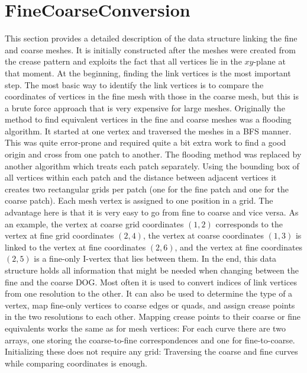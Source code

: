 \documentclass[a4paper,twoside,12pt,nochapterprefix]{scrbook}
\begin{document}
\section{FineCoarseConversion}\label{sec:conversion} %
This section provides a detailed description of the data structure linking the fine and coarse meshes. It is initially constructed after the meshes were created from the crease pattern and exploits the fact that all vertices lie in the $xy$-plane at that moment.\newline
At the beginning, finding the link vertices is the most important step. The most basic way to identify the link vertices is to compare the coordinates of vertices in the fine mesh with those in the coarse mesh, but this is a brute force approach that is very expensive for large meshes.\newline
Originally the method to find equivalent vertices in the fine and coarse meshes was a flooding algorithm. It started at one vertex and traversed the meshes in a BFS manner. This was quite error-prone and required quite a bit extra work to find a good origin and cross from one patch to another.\newline
The flooding method was replaced by another algorithm which treats each patch separately. Using the bounding box of all vertices within each patch and the distance between adjacent vertices it creates two rectangular grids per patch (one for the fine patch and one for the coarse patch). Each mesh vertex is assigned to one position in a grid. The advantage here is that it is very easy to go from fine to coarse and vice versa. As an example, the vertex at coarse grid coordinates $(1,2)$ corresponds to the vertex at fine grid coordinates $(2,4)$, the vertex at coarse coordinates $(1,3)$ is linked to the vertex at fine coordinates $(2,6)$, and the vertex at fine coordinates $(2,5)$ is a fine-only I-vertex that lies between them.\newline
In the end, this data structure holds all information that might be needed when changing between the fine and the coarse DOG. Most often it is used to convert indices of link vertices from one resolution to the other. It can also be used to determine the type of a vertex, map fine-only vertices to coarse edges or quads, and assign crease points in the two resolutions to each other.\newline
Mapping crease points to their coarse or fine equivalents works the same as for mesh vertices: For each curve there are two arrays, one storing the coarse-to-fine correspondences and one for fine-to-coarse. Initializing these does not require any grid: Traversing the coarse and fine curves while comparing coordinates is enough.\newline%
\end{document}
